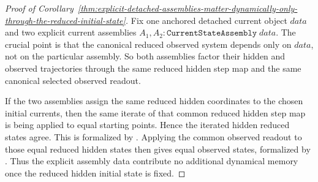 \begin{proof}[Proof of Corollary~\ref{thm:explicit-detached-assemblies-matter-dynamically-only-through-the-reduced-initial-state}]
\label{proof:thm:explicit-detached-assemblies-matter-dynamically-only-through-the-reduced-initial-state}
Fix one anchored detached current object \(data\) and two explicit current
assemblies \(A_1,A_2 : \texttt{CurrentStateAssembly}\;data\). The crucial point
is that the canonical reduced observed system
 depends only
on \(data\), not on the particular assembly. So both assemblies factor their
hidden and observed trajectories through the same reduced hidden step map and
the same canonical selected observed readout.

If the two assemblies assign the same reduced hidden coordinates to the chosen
initial currents, then the same iterate of that common reduced hidden step map
is being applied to equal starting points. Hence the iterated hidden reduced
states agree. This is formalized by
.
Applying the common observed readout to those equal reduced hidden states then
gives equal observed states, formalized by
.
Thus the explicit assembly data contribute no additional dynamical memory once
the reduced hidden initial state is fixed.
\end{proof}


